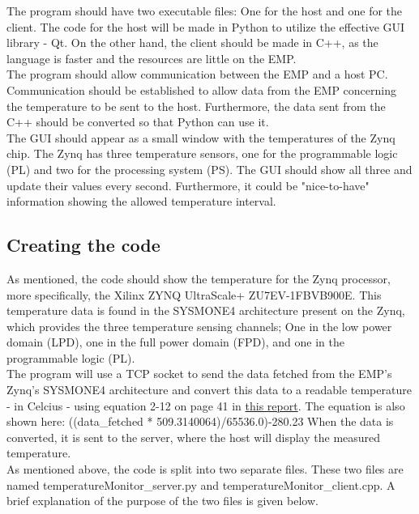 The program should have two executable files: One for the host and one for the client. The code for the host will be made in Python to utilize the effective GUI library - Qt. On the other hand, the client should be made in C++, as the language is faster and the resources are little on the EMP.\\

\noindent The program should allow communication between the EMP and a host PC. Communication should be established to allow data from the EMP concerning the temperature to be sent to the host. Furthermore, the data sent from the C++ should be converted so that Python can use it. \\

\noindent The GUI should appear as a small window with the temperatures of the Zynq chip. The Zynq has three temperature sensors, one for the programmable logic (PL) and two for the processing system (PS). The GUI should show all three and update their values every second. Furthermore, it could be "nice-to-have" information showing the allowed temperature interval. \\

\subsection{Creating the code}

As mentioned, the code should show the temperature for the Zynq processor, more specifically, the Xilinx ZYNQ UltraScale+ ZU7EV-1FBVB900E. This temperature data is found in the SYSMONE4 architecture present on the Zynq, which provides the three temperature sensing channels;  One in the low power domain (LPD), one in the full power domain (FPD), and one in the programmable logic (PL). \\

\noindent 
The program will use a TCP socket to send the data fetched from the EMP's Zynq's SYSMONE4 architecture and convert this data to a readable temperature - in Celcius - using equation 2-12 on page 41 in \href{https://china.xilinx.com/content/dam/xilinx/support/documents/user\_guides/ug580-ultrascale-sysmon.pdf}{this report}. The equation is also shown here:
((data\_fetched * 509.3140064)/65536.0)-280.23
When the data is converted, it is sent to the server, where the host will display the measured temperature.\\

\noindent As mentioned above, the code is split into two separate files. These two files are named temperatureMonitor\_server.py and temperatureMonitor\_client.cpp. A brief explanation of the purpose of the two files is given below. 

